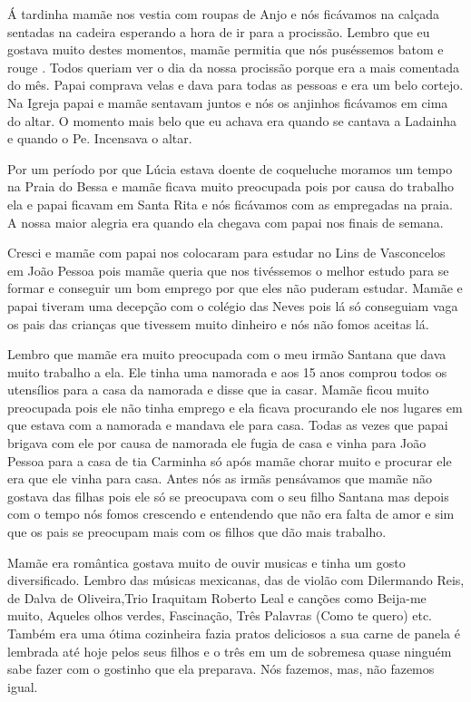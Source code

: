 \documentclass[
  brazil,
  a6paper,
  oneside,
  landscape,
  14pt]{scrbook}
\begin{document}
Á tardinha mamãe nos vestia com roupas de Anjo e nós ficávamos na
calçada sentadas na cadeira esperando a hora de ir para a procissão.
Lembro que eu gostava muito destes momentos, mamãe permitia que nós
puséssemos batom e rouge . Todos queriam ver o dia da nossa procissão
porque era a mais comentada do mês. Papai comprava velas e dava para
todas as pessoas e era um belo cortejo. Na Igreja papai e mamãe sentavam
juntos e nós os anjinhos ficávamos em cima do altar. O momento mais belo
que eu achava era quando se cantava a Ladainha e quando o Pe. Incensava
o altar.

Por um período por que Lúcia estava doente de coqueluche moramos um
tempo na Praia do Bessa e mamãe ficava muito preocupada pois por causa
do trabalho ela e papai ficavam em Santa Rita e nós ficávamos com as
empregadas na praia. A nossa maior alegria era quando ela chegava com
papai nos finais de semana.

Cresci e mamãe com papai nos colocaram para estudar no Lins de
Vasconcelos em João Pessoa pois mamãe queria que nos tivéssemos o melhor
estudo para se formar e conseguir um bom emprego por que eles não
puderam estudar. Mamãe e papai tiveram uma decepção com o colégio das
Neves pois lá só conseguiam vaga os pais das crianças que tivessem muito
dinheiro e nós não fomos aceitas lá.

Lembro que mamãe era muito preocupada com o meu irmão Santana que dava
muito trabalho a ela. Ele tinha uma namorada e aos 15 anos comprou todos
os utensílios para a casa da namorada e disse que ia casar. Mamãe ficou
muito preocupada pois ele não tinha emprego e ela ficava procurando ele
nos lugares em que estava com a namorada e mandava ele para casa. Todas
as vezes que papai brigava com ele por causa de namorada ele fugia de
casa e vinha para João Pessoa para a casa de tia Carminha só após mamãe
chorar muito e procurar ele era que ele vinha para casa. Antes nós as
irmãs pensávamos que mamãe não gostava das filhas pois ele só se
preocupava com o seu filho Santana mas depois com o tempo nós fomos
crescendo e entendendo que não era falta de amor e sim que os pais se
preocupam mais com os filhos que dão mais trabalho.

Mamãe era romântica gostava muito de ouvir musicas e tinha um gosto
diversificado. Lembro das músicas mexicanas, das de violão com
Dilermando Reis, de Dalva de Oliveira,Trio Iraquitam Roberto Leal e
canções como Beija-me muito, Aqueles olhos verdes, Fascinação, Três
Palavras (Como te quero) etc. Também era uma ótima cozinheira fazia
pratos deliciosos a sua carne de panela é lembrada até hoje pelos seus
filhos e o três em um de sobremesa quase ninguém sabe fazer com o
gostinho que ela preparava. Nós fazemos, mas, não fazemos igual.
\end{document}
